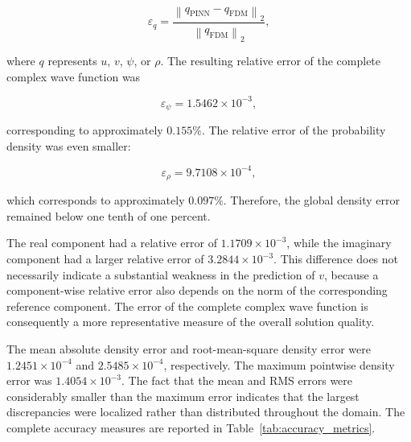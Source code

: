 \documentclass[11pt]{article}
\begin{document}
\begin{equation}
	\varepsilon_q
	=
	\frac{
		\left\|
		q_{\mathrm{PINN}}-q_{\mathrm{FDM}}
		\right\|_2
	}{
		\left\|
		q_{\mathrm{FDM}}
		\right\|_2
	},
\end{equation}

where \(q\) represents \(u\), \(v\), \(\psi\), or \(\rho\). The resulting relative error of the complete complex wave function was

\begin{equation}
	\varepsilon_{\psi}
	=
	1.5462\times10^{-3},
\end{equation}

corresponding to approximately \(0.155\%\). The relative error of the probability density was even smaller:

\begin{equation}
	\varepsilon_{\rho}
	=
	9.7108\times10^{-4},
\end{equation}

which corresponds to approximately \(0.097\%\). Therefore, the global density error remained below one tenth of one percent.

The real component had a relative error of \(1.1709\times10^{-3}\), while the imaginary component had a 
larger relative error of \(3.2844\times10^{-3}\). This difference does not necessarily 
indicate a substantial weakness in the prediction of \(v\), because a component-wise 
relative error also depends on the norm of the corresponding reference component. 
The error of the complete complex wave function is consequently a more representative 
measure of the overall solution quality.

The mean absolute density error and 
root-mean-square density error were \(1.2451\times10^{-4}\) and \(2.5485\times10^{-4}\), 
respectively. The maximum pointwise density error was \(1.4054\times10^{-3}\). The fact 
that the mean and RMS errors were considerably smaller than the maximum error indicates that the 
largest discrepancies were localized rather than distributed throughout the domain. The complete 
accuracy measures are reported in Table~\ref{tab:accuracy_metrics}.
\end{document}
